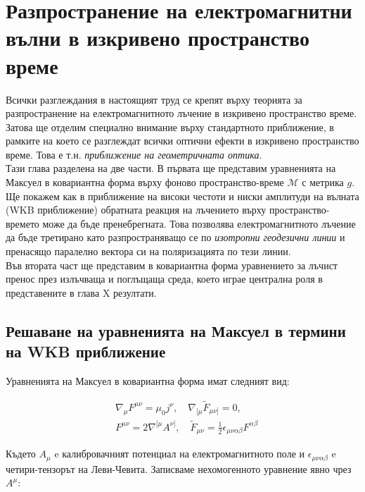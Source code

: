 \section{Разпространение на електромагнитни вълни в изкривено пространство време}

Всички разглеждания в настоящият труд се крепят върху теорията за разпространение на електромагнитното лъчение в изкривено пространство време. Затова ще отделим специално внимание върху стандартното приближение, в рамките на което се разглеждат всички оптични ефекти в изкривено пространство време. Това е т.н. \emph{приближение на геометричната оптика}. \\

Тази глава разделена на две части. В първата ще представим уравненията на Максуел в ковариантна форма върху фоново пространство-време $\mathcal{M}$ с метрика $g$. Ще покажем как в приближение на високи честоти и ниски амплитуди на вълната (WKB приближение) обратната реакция на лъчението върху пространство-времето може да бъде пренебрегната. Това позволява електромагнитното лъчение да бъде третирано като разпространяващо се по \emph{изотропни геодезични линии} и пренасящо паралелно вектора си на поляризацията по тези линии.\\
Във втората част ще представим в ковариантна форма уравнението за лъчист пренос през излъчваща и поглъщаща среда, което играе централна роля в представените в глава {\color{red} X} резултати.

\subsection{Решаване на уравненията на Максуел в термини на WKB приближение}

Уравненията на Максуел в ковариантна форма имат следният вид:

\begin{equation}
	\begin{split}
	&\nabla_\mu F^{\mu\nu} = \mu_0 j^\nu,\quad \nabla_{[\mu}\tilde{F}_{\mu\nu]} = 0,\\
	&F^{\mu\nu} = 2\nabla^{[\mu}A^{\nu]}, \quad \tilde{F}_{\mu\nu} = \frac{1}{2}\epsilon_{\mu\nu\alpha\beta}F^{\alpha\beta}
	\end{split}
\end{equation}

Където $A_\mu$ e калибровачният потенциал на електромагнитното поле и $\epsilon_{\mu\nu\alpha\beta}$ e четири-тензорът на Леви-Чевита. Записваме нехомогенното уравнение явно чрез $A^\mu$:

